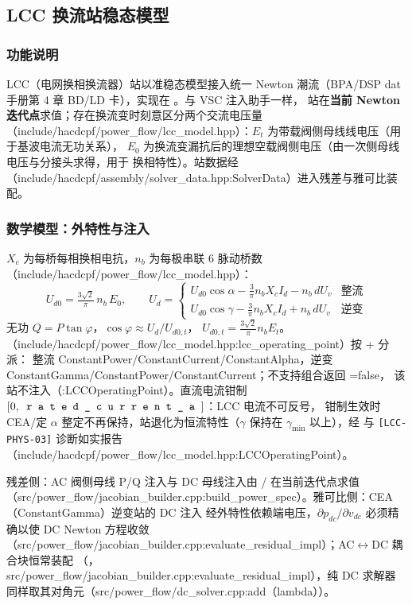 \subsection{LCC 换流站稳态模型}\label{sec:hybrid-lcc}


\subsubsection*{功能说明}
LCC（电网换相换流器）站以准稳态模型接入统一 Newton 潮流（BPA/DSP dat 手册第 4 章
BD/LD 卡），实现在 。与 VSC 注入助手一样，
站在\textbf{当前 Newton 迭代点}求值；存在换流变时刻意区分两个交流电压量
（include/hacdcpf/power\_flow/lcc\_model.hpp）：$E_t$ 为带载阀侧母线线电压（用于基波电流无功关系），
$E_0$ 为换流变漏抗后的理想空载阀侧电压（由一次侧母线电压与分接头求得，用于
换相特性）。站数据经 
（include/hacdcpf/assembly/solver\_data.hpp:SolverData）进入残差与雅可比装配。

\subsubsection*{数学模型：外特性与注入}
$X_c$ 为每桥每相换相电抗，$n_b$ 为每极串联 6 脉动桥数（include/hacdcpf/power\_flow/lcc\_model.hpp）：
\[
U_{d0}=\tfrac{3\sqrt{2}}{\pi}\,n_b\,E_0,\qquad
U_d=\begin{cases}
U_{d0}\cos\alpha-\tfrac{3}{\pi}n_b X_c I_d-n_b\,dU_v & \text{整流}\\
U_{d0}\cos\gamma-\tfrac{3}{\pi}n_b X_c I_d+n_b\,dU_v & \text{逆变}
\end{cases}
\]
无功 $Q=P\tan\varphi$，$\cos\varphi\approx U_d/U_{d0,t}$，
$U_{d0,t}=\tfrac{3\sqrt{2}}{\pi}n_b E_t$。
（include/hacdcpf/power\_flow/lcc\_model.hpp:lcc\_operating\_point）按 + 分派：
整流 ConstantPower/ConstantCurrent/ConstantAlpha，逆变
ConstantGamma/ConstantPower/ConstantCurrent；不支持组合返回 =false，
该站不注入（:LCCOperatingPoint）。直流电流钳制 $[0,\fld{rated\_current\_a}]$：LCC 电流不可反号，
钳制生效时 CEA/定 $\alpha$ 整定不再保持，站退化为恒流特性（$\gamma$ 保持在
$\gamma_{\min}$ 以上），经  与
\texttt{[LCC-PHYS-03]} 诊断如实报告（include/hacdcpf/power\_flow/lcc\_model.hpp:LCCOperatingPoint）。

残差侧：AC 阀侧母线 P/Q 注入与 DC 母线注入由
/ 在当前迭代点求值
（src/power\_flow/jacobian\_builder.cpp:build\_power\_spec）。雅可比侧：CEA（ConstantGamma）逆变站的 DC 注入
经外特性依赖端电压，$\partial p_{dc}/\partial v_{dc}$ 必须精确以使 DC Newton 方程收敛
（src/power\_flow/jacobian\_builder.cpp:evaluate\_residual\_impl）；AC$\leftrightarrow$DC 耦合块恒常装配
（，src/power\_flow/jacobian\_builder.cpp:evaluate\_residual\_impl），纯 DC 求解器
同样取其对角元（src/power\_flow/dc\_solver.cpp:add（lambda））。

